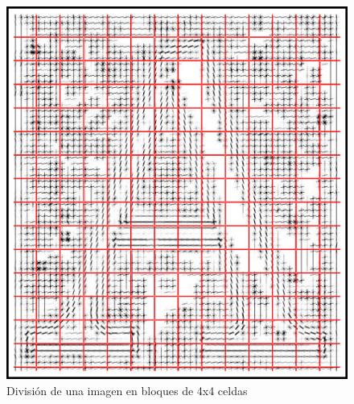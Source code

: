 		\begin{figure}[htbp]
			\centering
			\centerline{ \includegraphics[scale=0.7]{img/letter_A_with_cells_inv.jpg} }
			\caption[División por bloques de una imagen]{División de una imagen en bloques de 4x4 celdas}
			\label{fig: Division por bloques en imagen}
		\end{figure}
		
